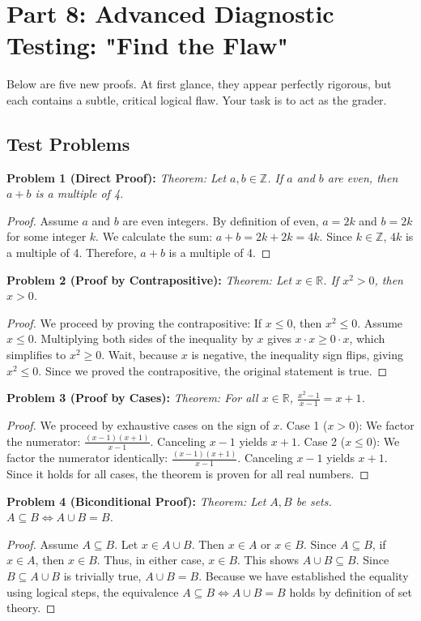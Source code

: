 \documentclass[11pt, letterpaper]{article}
\theoremstyle{definition}
\theoremstyle{remark}
\newcommand{\Z}{\mathbb{Z}}
\newcommand{\R}{\mathbb{R}}
\begin{document}
\newpage

\section{Part 8: Advanced Diagnostic Testing: "Find the Flaw"}

Below are five new proofs. At first glance, they appear perfectly rigorous, but each contains a subtle, critical logical flaw. Your task is to act as the grader.

\subsection{Test Problems}

\textbf{Problem 1 (Direct Proof):}
\textit{Theorem: Let $a, b \in \Z$. If $a$ and $b$ are even, then $a+b$ is a multiple of 4.}
\begin{proof}
Assume $a$ and $b$ are even integers. By definition of even, $a = 2k$ and $b = 2k$ for some integer $k$.
We calculate the sum: $a + b = 2k + 2k = 4k$.
Since $k \in \Z$, $4k$ is a multiple of 4. Therefore, $a+b$ is a multiple of 4.
\end{proof}

\textbf{Problem 2 (Proof by Contrapositive):}
\textit{Theorem: Let $x \in \R$. If $x^2 > 0$, then $x > 0$.}
\begin{proof}
We proceed by proving the contrapositive: If $x \le 0$, then $x^2 \le 0$.
Assume $x \le 0$. 
Multiplying both sides of the inequality by $x$ gives $x \cdot x \ge 0 \cdot x$, which simplifies to $x^2 \ge 0$.
Wait, because $x$ is negative, the inequality sign flips, giving $x^2 \le 0$.
Since we proved the contrapositive, the original statement is true.
\end{proof}

\textbf{Problem 3 (Proof by Cases):}
\textit{Theorem: For all $x \in \R$, $\frac{x^2 - 1}{x - 1} = x + 1$.}
\begin{proof}
We proceed by exhaustive cases on the sign of $x$.
Case 1 ($x > 0$): We factor the numerator: $\frac{(x-1)(x+1)}{x-1}$. Canceling $x-1$ yields $x+1$.
Case 2 ($x \le 0$): We factor the numerator identically: $\frac{(x-1)(x+1)}{x-1}$. Canceling $x-1$ yields $x+1$.
Since it holds for all cases, the theorem is proven for all real numbers.
\end{proof}

\textbf{Problem 4 (Biconditional Proof):}
\textit{Theorem: Let $A, B$ be sets. $A \subseteq B \iff A \cup B = B$.}
\begin{proof}
Assume $A \subseteq B$. Let $x \in A \cup B$. Then $x \in A$ or $x \in B$. Since $A \subseteq B$, if $x \in A$, then $x \in B$. Thus, in either case, $x \in B$. This shows $A \cup B \subseteq B$. Since $B \subseteq A \cup B$ is trivially true, $A \cup B = B$.
Because we have established the equality using logical steps, the equivalence $A \subseteq B \iff A \cup B = B$ holds by definition of set theory.
\end{proof}
\end{document}
